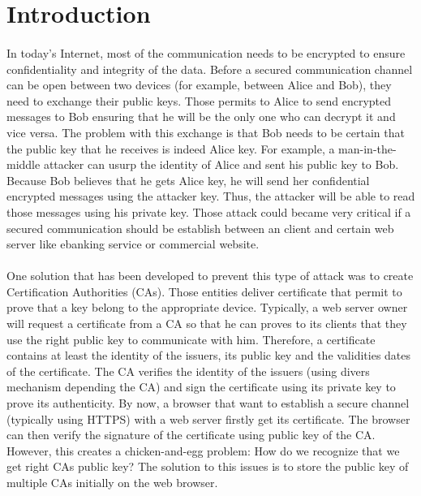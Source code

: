 \documentclass[11pt, a4paper, twoside, openright]{article}
\begin{document}

\tableofcontents
\section{Introduction}
\paragraph{}In today's Internet, most of the communication needs to be encrypted to ensure confidentiality and integrity of the data. Before a secured communication channel can be open between two devices (for example, between Alice and Bob), they need to exchange their public keys. Those permits to Alice to send encrypted messages to Bob ensuring that he will be the only one who can decrypt it and vice versa. The problem with this exchange is that Bob needs to be certain that the public key that he receives is indeed Alice key. For example, a man-in-the-middle attacker can usurp the identity of Alice and sent his public key to Bob. Because Bob believes that he gets Alice key, he will send her confidential encrypted messages using the attacker key. Thus, the attacker will be able to read those messages using his private key.
Those attack could became very critical if a secured communication should be establish between an client and certain web server like ebanking service or commercial website.   
\paragraph{}
One solution that has been developed to prevent this type of attack was to create Certification Authorities (CAs). Those entities deliver certificate that permit to prove that a key belong to the appropriate device. Typically, a web server owner will request a certificate from a CA so that he can proves to its clients that they use the right public key to communicate with him. Therefore, a certificate contains at least the identity of the issuers, its public key and the validities dates of the certificate. The CA verifies the identity of the issuers (using divers mechanism depending the CA) and sign the certificate using its private key to prove its authenticity. By now, a browser that want to establish a secure channel (typically using HTTPS) with a web server firstly get its certificate. The browser can then verify the signature of the certificate using public key of the CA.  
However, this creates a chicken-and-egg problem: How do we recognize that we get right CAs public key? The solution to this issues is to store the public key of multiple CAs initially on the web browser.
\end{document}
